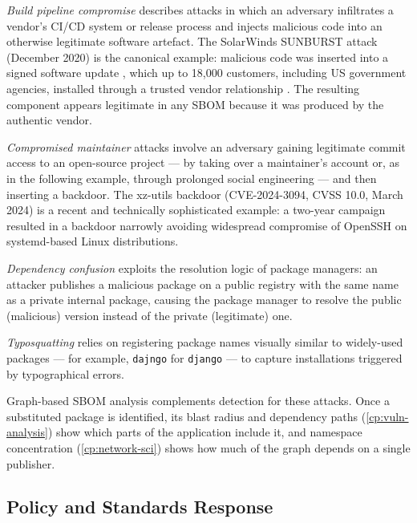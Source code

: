 \textit{Build pipeline compromise} describes attacks in which an adversary infiltrates a vendor's CI/CD system or release process and injects malicious code into an otherwise legitimate software artefact. The SolarWinds SUNBURST attack (December 2020) is the canonical example: malicious code was inserted into a signed software update \citep{CISA_AA20_352A}, which up to 18{,}000 customers, including US government agencies, installed through a trusted vendor relationship \citep{SolarWinds8K2020}. The resulting component appears legitimate in any SBOM because it was produced by the authentic vendor.

\textit{Compromised maintainer} attacks involve an adversary gaining legitimate commit access to an open-source project --- by taking over a maintainer's account or, as in the following example, through prolonged social engineering --- and then inserting a backdoor. The xz-utils backdoor (CVE-2024-3094, CVSS 10.0, March 2024) \citep{NVD_CVE_2024_3094} is a recent and technically sophisticated example: a two-year campaign resulted in a backdoor narrowly avoiding widespread compromise of OpenSSH on systemd-based Linux distributions.

\textit{Dependency confusion} exploits the resolution logic of package managers: an attacker publishes a malicious package on a public registry with the same name as a private internal package, causing the package manager to resolve the public (malicious) version instead of the private (legitimate) one.

\textit{Typosquatting} relies on registering package names visually similar to widely-used packages --- for example, \texttt{dajngo} for \texttt{django} \citep{Ladisa2023} --- to capture installations triggered by typographical errors.

Graph-based SBOM analysis complements detection for these attacks. Once a substituted package is identified, its blast radius and dependency paths (\autoref{cp:vuln-analysis}) show which parts of the application include it, and namespace concentration (\autoref{cp:network-sci}) shows how much of the graph depends on a single publisher.


\subsection{Policy and Standards Response}
\label{sec:policy-response}

